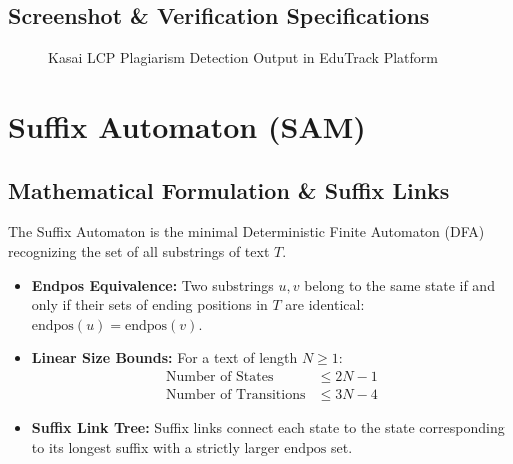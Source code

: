 \subsection{Screenshot \& Verification Specifications}
\begin{figure}[H]
    \centering
    \caption{Kasai LCP Plagiarism Detection Output in EduTrack Platform}
    \label{fig:screenshot_plagiarism}
\end{figure}

\section{Suffix Automaton (SAM)}
\subsection{Mathematical Formulation \& Suffix Links}
The Suffix Automaton is the minimal Deterministic Finite Automaton (DFA) recognizing the set of all substrings of text $T$.
\begin{itemize}
    \item \textbf{Endpos Equivalence:} Two substrings $u, v$ belong to the same state if and only if their sets of ending positions in $T$ are identical: $\text{endpos}(u) = \text{endpos}(v)$.
    \item \textbf{Linear Size Bounds:} For a text of length $N \ge 1$:
    \begin{align}
    \text{Number of States} &\le 2N - 1 \nonumber \\
    \text{Number of Transitions} &\le 3N - 4
    \end{align}
    \item \textbf{Suffix Link Tree:} Suffix links connect each state to the state corresponding to its longest suffix with a strictly larger $\text{endpos}$ set.
\end{itemize}

